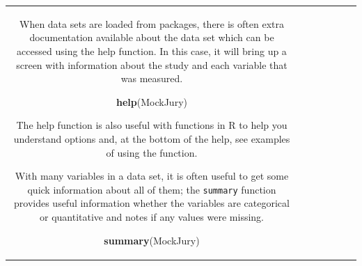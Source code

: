 \documentclass[]{book}
\newenvironment{Shaded}{\begin{snugshade}}{\end{snugshade}}
\newcommand{\KeywordTok}[1]{\textcolor[rgb]{0.13,0.29,0.53}{\textbf{#1}}}
\newcommand{\NormalTok}[1]{#1}
\theoremstyle{definition}
\theoremstyle{definition}
\theoremstyle{remark}
\begin{document}
\begin{longtable}[]{@{}ccccccc@{}}
\begin{minipage}[b]{0.10\columnwidth}
When data sets are loaded from packages, there is often extra
documentation available about the data set which can be accessed using
the help function. In this case, it will bring up a screen with
information about the study and each variable that was measured.

\begin{Shaded}
\begin{Highlighting}[]
\KeywordTok{help}\NormalTok{(MockJury)}
\end{Highlighting}
\end{Shaded}

The help function is also useful with functions in R to help you
understand options and, at the bottom of the help, see examples of using
the function.

With many variables in a data set, it is often useful to get some quick
information about all of them; the \texttt{summary} function provides
useful information whether the variables are categorical or quantitative
and notes if any values were missing.

\begin{Shaded}
\begin{Highlighting}[]
\KeywordTok{summary}\NormalTok{(MockJury)}
\end{Highlighting}
\end{Shaded}


\end{minipage}
\end{longtable}
\end{document}
